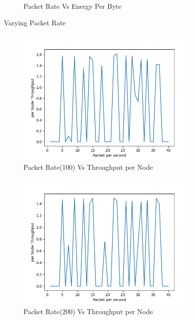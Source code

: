 \begin{figure}[h]
\begin{subfigure}{.5\textwidth}
     \caption{Packet Rate Vs Energy Per Byte}
     \label{packet_rate_energy_per_byte}
\end{subfigure}
\caption{Varying Packet Rate}
\label{fig:varyingPacketRate}
\end{figure}
\begin{figure}[h]
\begin{subfigure}{.5\textwidth}
  \centering
  \includegraphics[width=.8\linewidth]{_15_4_static/Packetpersecond(100)vsperNodeThroughput.png}
     \caption{Packet Rate(100) Vs Throughput per Node}
 \end{subfigure}
\begin{subfigure}{.5\textwidth}
  \centering
  \includegraphics[width=.8\linewidth]{_15_4_static/Packetpersecond(200)vsperNodeThroughput.png}
     \caption{Packet Rate(200) Vs Throughput per Node}
    \end{subfigure}
\begin{subfigure}{.5\textwidth}
    \centering

\end{subfigure}
\end{figure}
